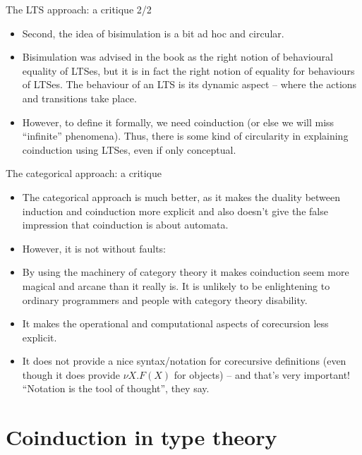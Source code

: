 \documentclass{beamer}
\begin{document}
\begin{frame}{The LTS approach: a critique 2/2}
\begin{itemize}
	\item Second, the idea of bisimulation is a bit ad hoc and circular.
	\item Bisimulation was advised in the book as the right notion of behavioural equality of LTSes, but it is in fact the right notion of equality for behaviours of LTSes. The behaviour of an LTS is its dynamic aspect -- where the actions and transitions take place.
	\item However, to define it formally, we need coinduction (or else we will miss ``infinite'' phenomena). Thus, there is some kind of circularity in explaining coinduction using LTSes, even if only conceptual.
\end{itemize}
\end{frame}

\begin{frame}{The categorical approach: a critique}
\begin{itemize}
	\item The categorical approach is much better, as it makes the duality between induction and coinduction more explicit and also doesn't give the false impression that coinduction is about automata.
	\item However, it is not without faults:
	\item By using the machinery of category theory it makes coinduction seem more magical and arcane than it really is. It is unlikely to be enlightening to ordinary programmers and people with category theory disability.
	\item It makes the operational and computational aspects of corecursion less explicit.
	\item It does not provide a nice syntax/notation for corecursive definitions (even though it does provide $\nu X. F(X)$ for objects) -- and that's very important! ``Notation is the tool of thought'', they say. 
\end{itemize}
\end{frame}

\section{Coinduction in type theory}
\end{document}
